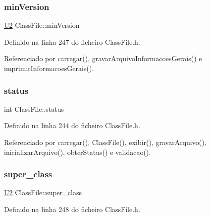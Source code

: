 \subsubsection{\texorpdfstring{min\+Version}{minVersion}}
{\footnotesize\ttfamily \hyperlink{BasicTypes_8h_a90240657108b1b457eef9d3f76e0202e}{U2} Class\+File\+::min\+Version\hspace{0.3cm}{\ttfamily [private]}}



Definido na linha 247 do ficheiro Class\+File.\+h.



Referenciado por carregar(), gravar\+Arquivo\+Informacoes\+Gerais() e imprimir\+Informacoes\+Gerais().

\mbox{\label{classClassFile_a9afeae9ac0889ab75909e73933e29326}} 
\subsubsection{\texorpdfstring{status}{status}}
{\footnotesize\ttfamily int Class\+File\+::status\hspace{0.3cm}{\ttfamily [private]}}



Definido na linha 244 do ficheiro Class\+File.\+h.



Referenciado por carregar(), Class\+File(), exibir(), gravar\+Arquivo(), inicializar\+Arquivo(), obter\+Status() e validacao().

\mbox{\label{classClassFile_ad92079216f8cdb366a3002e5ca2c2dfa}} 
\subsubsection{\texorpdfstring{super\+\_\+class}{super\_class}}
{\footnotesize\ttfamily \hyperlink{BasicTypes_8h_a90240657108b1b457eef9d3f76e0202e}{U2} Class\+File\+::super\+\_\+class\hspace{0.3cm}{\ttfamily [private]}}



Definido na linha 248 do ficheiro Class\+File.\+h.



